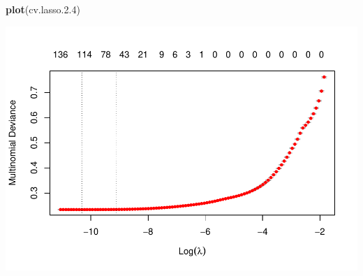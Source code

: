 \documentclass[
]{article}
\newenvironment{Shaded}{\begin{snugshade}}{\end{snugshade}}
\newcommand{\FloatTok}[1]{\textcolor[rgb]{0.00,0.00,0.81}{#1}}
\newcommand{\KeywordTok}[1]{\textcolor[rgb]{0.13,0.29,0.53}{\textbf{#1}}}
\newcommand{\NormalTok}[1]{#1}
\begin{document}
\begin{Shaded}
\begin{Highlighting}[]
\KeywordTok{plot}\NormalTok{(cv.lasso.}\FloatTok{2.4}\NormalTok{)}
\end{Highlighting}
\end{Shaded}

\includegraphics{dlassoMarkdown_files/figure-latex/unnamed-chunk-2-4.pdf}
\end{document}

